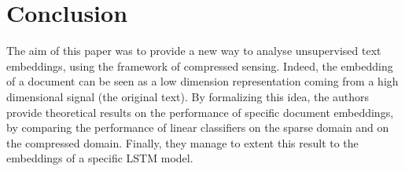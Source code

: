 \documentclass{article}
\begin{document}
\section*{Conclusion}

The aim of this paper was to provide a new way to analyse unsupervised text embeddings, using the framework of compressed sensing. Indeed, the embedding of a document can be seen as a low dimension representation coming from a high dimensional signal (the original text). By formalizing this idea, the authors provide theoretical results on the performance of specific document embeddings, by comparing the performance of linear classifiers on the sparse domain and on the compressed domain. Finally, they manage to extent this result to the embeddings of a specific LSTM model.














\newpage 
{}
 

\end{document}
